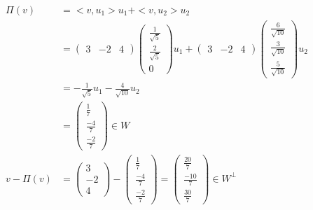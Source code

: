 \begin{align}
\Pi(v) &= <v, u_1> u_1 + <v, u_2> u_2 \\
&= \begin{pmatrix} 3 & -2 & 4 \end{pmatrix} \begin{pmatrix} \frac{1}{\sqrt{5}} \\ \frac{2}{\sqrt{5}} \\ 0\end{pmatrix} u_1 + \begin{pmatrix} 3 & -2 & 4 \end{pmatrix} \begin{pmatrix} \frac{6}{\sqrt{10}} \\ \frac{3}{\sqrt{10}} \\ \frac{5}{\sqrt{10}} \end{pmatrix} u_2 \\
&= -\frac{1}{\sqrt{5}} u_1 - \frac{4}{\sqrt{10}} u_2 \\
&= \begin{pmatrix} \frac{1}{7} \\ \frac{-4}{7} \\ \frac{-2}{7} \end{pmatrix} \in W \\
v - \Pi(v) &= \begin{pmatrix} 3  \\ -2 \\ 4 \end{pmatrix} - \begin{pmatrix} \frac{1}{7} \\ \frac{-4}{7} \\ \frac{-2}{7} \end{pmatrix} = \begin{pmatrix} \frac{20}{7} \\ \frac{-10}{7} \\ \frac{30}{7} \end{pmatrix} \in W^{\perp}
\end{align}

